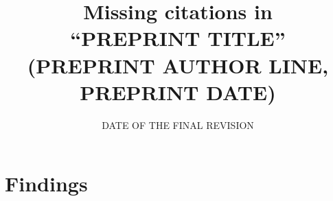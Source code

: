 \documentclass[11pt]{article}
\title{Missing citations in\\ ``{PREPRINT TITLE}''\\[4pt]
\large ({PREPRINT AUTHOR LINE}, {PREPRINT DATE})}
\date{{DATE OF THE FINAL REVISION}}
\begin{document}
\maketitle



\tableofcontents




\section{Findings}\label{sec:findings}



\end{document}
